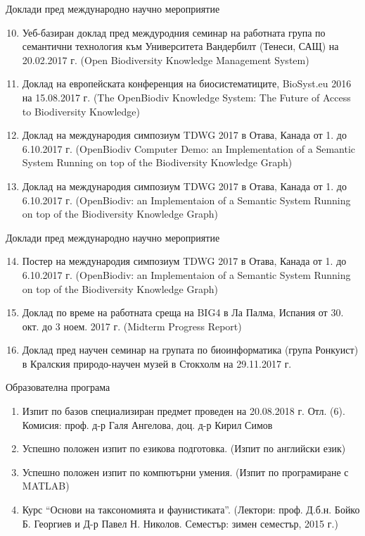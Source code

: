 \documentclass[bulgarian]{beamer}
\begin{document}
\begin{frame}{Доклади пред международно научно мероприятие}
    \begin{enumerate}
    \setcounter{enumi}{9}
     \item Уеб-базиран доклад пред междуродния семинар на работната група по семантични технология към Университета Вандербилт (Тенеси, САЩ) на 20.02.2017 г. (Open Biodiversity Knowledge Management System)
    \item Доклад на европейската конференция на биосистематиците, BioSyst.eu 2016 на 15.08.2017 г. (The OpenBiodiv Knowledge System: The Future of Access to Biodiversity Knowledge)
    \item Доклад на международия симпозиум TDWG 2017 в Отава, Канада от 1. до 6.10.2017 г. (OpenBiodiv Computer Demo: an Implementation of a Semantic System Running on top of the Biodiversity Knowledge Graph)
    \item Доклад на международия симпозиум TDWG 2017 в Отава, Канада от 1. до 6.10.2017 г. (OpenBiodiv: an Implementaion of a Semantic System Running on top of the Biodiversity Knowledge Graph)
   
    \end{enumerate}
\end{frame}


\begin{frame}{Доклади пред международно научно мероприятие}
\begin{enumerate}
    \setcounter{enumi}{13}
     \item Постер на международия симпозиум TDWG 2017 в Отава, Канада от 1. до 6.10.2017 г. (OpenBiodiv: an Implementaion of a Semantic System Running on top of the Biodiversity Knowledge Graph)
    \item Доклад по време на работната среща на BIG4 в Ла Палма, Испания от 30. окт. до 3 ноем. 2017 г. (Midterm Progress Report)
    \item Доклад пред научен семинар на групата по биоинформатика (група Ронкуист) в Кралския природо-научен музей в Стокхолм на 29.11.2017 г.
\end{enumerate}
\end{frame}



\begin{frame}{Образователна програма}

\begin{enumerate}
    \item Изпит по базов специализиран предмет проведен на 20.08.2018 г. Отл. (6). Комисия: проф. д-р Галя Ангелова, доц. д-р Кирил Симов
    \item Успешно положен изпит по езикова подготовка. (Изпит по английски език)   
    \item Успешно положен изпит по компютърни умения. (Изпит по програмиране с MATLAB)
    \item Курс ``Основи на таксономията и фаунистиката''. (Лектори: проф. Д.б.н. Бойко Б. Георгиев и Д-р Павел Н. Николов. Семестър: зимен семестър, 2015 г.)
 

\end{enumerate}

\end{frame}
\end{document}
